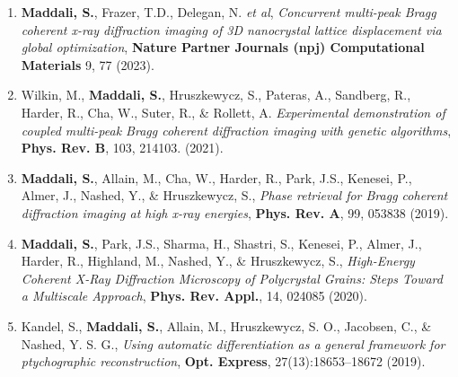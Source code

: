 \begin{enumerate}
    \item \textbf{Maddali, S.}, Frazer, T.D., Delegan, N. \emph{et al}, \emph{Concurrent multi-peak Bragg coherent x-ray diffraction imaging of 3D nanocrystal lattice displacement via global optimization}, \textbf{Nature Partner Journals (npj) Computational Materials} 9, 77 (2023).
    \item Wilkin, M., \textbf{Maddali, S.}, Hruszkewycz, S., Pateras, A., Sandberg, R., Harder, R., Cha, W., Suter, R., \& Rollett, A. \emph{Experimental demonstration of coupled multi-peak Bragg coherent diffraction imaging with genetic algorithms}, \textbf{Phys. Rev. B}, 103, 214103. (2021).
    \item \textbf{Maddali, S.}, Allain, M., Cha, W., Harder, R., Park, J.S., Kenesei, P., Almer, J., Nashed, Y., \& Hruszkewycz, S., \emph{Phase retrieval for Bragg coherent diffraction imaging at high x-ray energies}, \textbf{Phys. Rev. A}, 99, 053838 (2019).
    \item \textbf{Maddali, S.}, Park, J.S., Sharma, H., Shastri, S., Kenesei, P., Almer, J., Harder, R., Highland, M., Nashed, Y., \& Hruszkewycz, S., \emph{High-Energy Coherent X-Ray Diffraction Microscopy of Polycrystal Grains: Steps Toward a Multiscale Approach}, \textbf{Phys. Rev. Appl.}, 14, 024085 (2020).
    \item Kandel, S., \textbf{Maddali, S.}, Allain, M., Hruszkewycz, S. O., Jacobsen, C., \& Nashed, Y. S. G., \emph{Using automatic differentiation as a general framework for ptychographic reconstruction}, \textbf{Opt. Express}, 27(13):18653–18672 (2019).

\end{enumerate}
